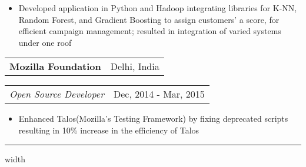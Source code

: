 \documentclass[10.5pt]{article}
\makeatletter
\newenvironment{subs}
  {\adjustwidth{1em}{0pt}}
  {\endadjustwidth}
\newcommand{\headerrow}[2]
{\begin{tabular*}{\linewidth}{l@{\extracolsep{\fill}}r}
	#1 &
	#2 \\
\end{tabular*}}
\makeatother
\begin{document}
\begin{subs}
\begin{itemize}[noitemsep,topsep=0pt]
\item Developed application in Python and Hadoop integrating libraries for K-NN, Random Forest, and Gradient Boosting to assign customers' a score, for efficient campaign management; resulted in integration of varied systems under one roof
\end{itemize}
\vspace{4pt}
\headerrow
		{\textbf{Mozilla Foundation}}
                {Delhi, India}
\vspace{5pt}
\headerrow
               {\textit{Open Source Developer}}
               {Dec, 2014 - Mar, 2015}
\vspace{-15pt}
\begin{itemize}[noitemsep,topsep=0pt]
\item Enhanced Talos(Mozilla's Testing Framework) by fixing deprecated scripts resulting in 10\% increase in the efficiency of Talos
\end{itemize}
\end{subs}

\vspace{0.6em}
\normalsize
\hrule width \hsize \kern 0.5mm
\vspace{-10pt}
\end{document}
